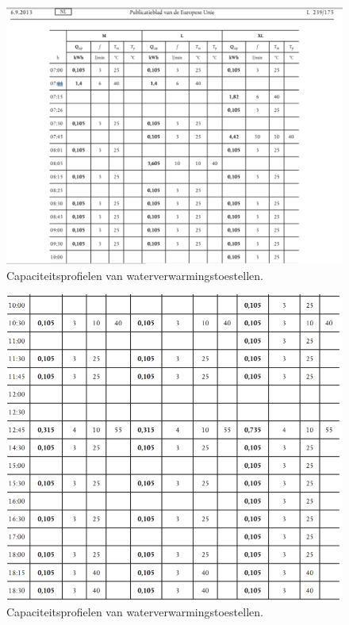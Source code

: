 	
\begin{figure}[H]
	\centering
	\includegraphics[width=1\columnwidth]{pictures/Profile_M1.png}
	\caption[Short title]{Capaciteitsprofielen van waterverwarmingstoestellen.}
	\label{fig:capaciteitM1}
\end{figure}
	
\begin{figure}[H]
	\centering
	\includegraphics[width=1\columnwidth]{pictures/Profile_M2.png}
	\caption[Short title]{Capaciteitsprofielen van waterverwarmingstoestellen.}
	\label{fig:capaciteitM2}
\end{figure}
	
